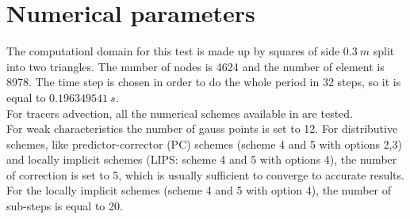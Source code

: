 \section{Numerical parameters}
%
The computationl domain for this test is made up by squares of side $0.3~m$ split into two triangles.
The number of nodes is 4624 and the number of element is 8978.
The time step is chosen in order to do the whole period in 32 steps, so it is equal to $0.196349541~s$.
\\
For tracers advection, all the numerical schemes available in  are tested. \\
For weak characteristics the number of gauss points is set to 12. For distributive schemes, like predictor-corrector (PC) schemes (scheme 4 and 5 with options 2,3) and locally implicit schemes (LIPS: scheme 4 and 5 with options 4), the number of correction is set to 5, which is usually sufficient to converge to accurate results. For the locally implicit schemes (scheme 4 and 5 with option 4), the number of sub-steps is equal to 20.
%
%
%

